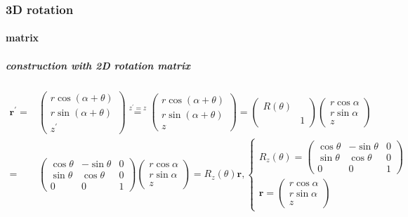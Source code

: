 \documentclass[
]{book}
\theoremstyle{definition}
\theoremstyle{definition}
\theoremstyle{definition}
\theoremstyle{definition}
\theoremstyle{remark}
\begin{document}
\subsubsection{3D rotation}\label{d-rotation-1}

\paragraph{matrix}\label{matrix-2}

\subparagraph{construction with 2D rotation matrix}\label{construction-with-2d-rotation-matrix}

\[
\begin{aligned}
\boldsymbol{r}^{\prime}= & \begin{pmatrix}r\cos\left(\alpha+\theta\right)\\
r\sin\left(\alpha+\theta\right)\\
z^{\prime}
\end{pmatrix}\overset{z^{\prime}=z}{=}\begin{pmatrix}r\cos\left(\alpha+\theta\right)\\
r\sin\left(\alpha+\theta\right)\\
z
\end{pmatrix}=\begin{pmatrix}R\left(\theta\right)\\
 & 1
\end{pmatrix}\begin{pmatrix}r\cos\alpha\\
r\sin\alpha\\
z
\end{pmatrix}\\
= & \begin{pmatrix}\cos\theta & -\sin\theta & 0\\
\sin\theta & \cos\theta & 0\\
0 & 0 & 1
\end{pmatrix}\begin{pmatrix}r\cos\alpha\\
r\sin\alpha\\
z
\end{pmatrix}=R_{{\scriptscriptstyle z}}\left(\theta\right)\boldsymbol{r},\begin{cases}
R_{{\scriptscriptstyle z}}\left(\theta\right)=\begin{pmatrix}\cos\theta & -\sin\theta & 0\\
\sin\theta & \cos\theta & 0\\
0 & 0 & 1
\end{pmatrix}\\
\boldsymbol{r}=\begin{pmatrix}r\cos\alpha\\
r\sin\alpha\\
z
\end{pmatrix}
\end{cases}
\end{aligned}
\]
\end{document}
